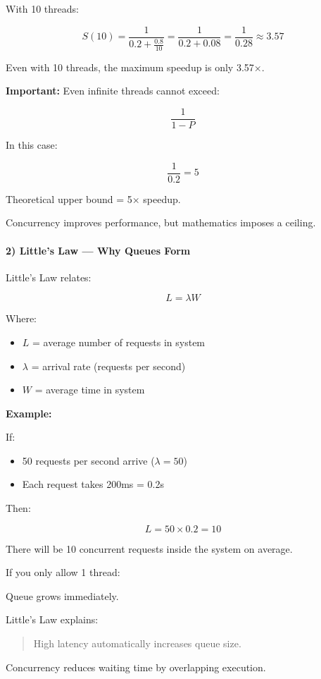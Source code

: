 \documentclass[11pt,a4paper]{article}
\begin{document}
With 10 threads:

\[
S(10) = \frac{1}{0.2 + \frac{0.8}{10}}
= \frac{1}{0.2 + 0.08}
= \frac{1}{0.28}
\approx 3.57
\]

Even with 10 threads, the maximum speedup is only 3.57×.

\textbf{Important:}
Even infinite threads cannot exceed:

\[
\frac{1}{1-P}
\]

In this case:

\[
\frac{1}{0.2} = 5
\]

Theoretical upper bound = 5× speedup.

Concurrency improves performance,
but mathematics imposes a ceiling.

\paragraph{2) Little's Law --- Why Queues Form}

Little's Law relates:

\[
L = \lambda W
\]

Where:
\begin{itemize}
	\item $L$ = average number of requests in system
	\item $\lambda$ = arrival rate (requests per second)
	\item $W$ = average time in system
\end{itemize}

\textbf{Example:}

If:
\begin{itemize}
	\item 50 requests per second arrive ($\lambda=50$)
	\item Each request takes 200ms = 0.2s
\end{itemize}

Then:

\[
L = 50 \times 0.2 = 10
\]

There will be 10 concurrent requests inside the system on average.

If you only allow 1 thread:

Queue grows immediately.

Little's Law explains:
\begin{quote}
	High latency automatically increases queue size.
\end{quote}

Concurrency reduces waiting time by overlapping execution.
\end{document}
